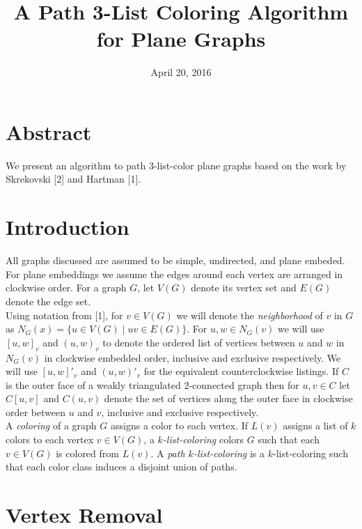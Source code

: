 \documentclass[12pt,a4paper]{article}
\begin{document}
\title{A Path 3-List Coloring Algorithm for Plane Graphs}
\date{April 20, 2016}

\maketitle

\section*{Abstract}

We present an algorithm to path $3$-list-color plane graphs based on the work by Skrekovski [2]
and Hartman [1].

\section*{Introduction}

\noindent All graphs discussed are assumed to be simple, undirected, and plane embeded. For plane embeddings we assume
the edges around each vertex are arranged in clockwise order. For a graph $G$, let $V(G)$ denote its vertex set
and $E(G)$ denote the edge set.\\

\noindent Using notation from [1], for $v\in V(G)$ we will denote the \emph{neighborhood} of $v$ in $G$ as
$N_G(x)=\{u\in V(G)\mid uv\in E(G)\}$. For $u,w\in N_G(v)$ we will use $[u,w]_v$ and $(u,w)_v$ to denote the ordered list of vertices between $u$
and $w$ in $N_G(v)$ in clockwise embedded order, inclusive and exclusive respectively. We will use $[u,w]'_v$ and $(u,w)'_v$ for the
equivalent counterclockwise listings. If $C$ is the outer face of a weakly triangulated $2$-connected
graph then for $u,v\in C$ let $C[u,v]$ and $C(u,v)$ denote the set of
vertices along the outer face in clockwise order between $u$ and $v$, inclusive and exclusive respectively. \\

\noindent A \emph{coloring} of a graph $G$ assigns a color to each vertex. If $L(v)$ assigns
a list of $k$ colors to each vertex $v\in V(G)$, a \emph{$k$-list-coloring} colors $G$ such
that each $v\in V(G)$ is colored from $L(v)$. A \emph{path $k$-list-coloring} is a $k$-list-coloring such that
each color class induces a disjoint union of paths.

\section*{Vertex Removal}
\end{document}
